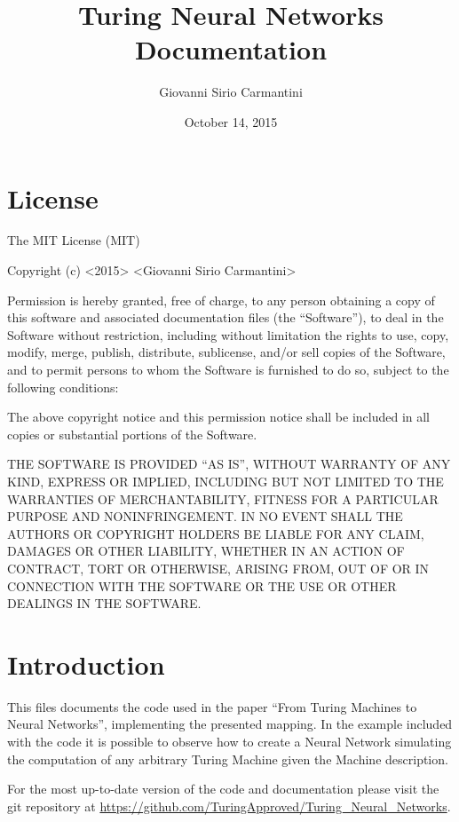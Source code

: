 \documentclass[letterpaper,10pt,english]{sphinxmanual}
\title{Turing Neural Networks Documentation}
\date{October 14, 2015}
\author{Giovanni Sirio Carmantini}
\begin{document}
\maketitle
\tableofcontents
{}\label{index::doc}



\chapter{License}
\label{license:turing-neural-networks-code-documentation}\label{license::doc}\label{license:license}
The MIT License (MIT)

Copyright (c) \textless{}2015\textgreater{} \textless{}Giovanni Sirio Carmantini\textgreater{}

Permission is hereby granted, free of charge, to any person obtaining a copy
of this software and associated documentation files (the ``Software''), to deal
in the Software without restriction, including without limitation the rights
to use, copy, modify, merge, publish, distribute, sublicense, and/or sell
copies of the Software, and to permit persons to whom the Software is
furnished to do so, subject to the following conditions:

The above copyright notice and this permission notice shall be included in
all copies or substantial portions of the Software.

THE SOFTWARE IS PROVIDED ``AS IS'', WITHOUT WARRANTY OF ANY KIND, EXPRESS OR
IMPLIED, INCLUDING BUT NOT LIMITED TO THE WARRANTIES OF MERCHANTABILITY,
FITNESS FOR A PARTICULAR PURPOSE AND NONINFRINGEMENT. IN NO EVENT SHALL THE
AUTHORS OR COPYRIGHT HOLDERS BE LIABLE FOR ANY CLAIM, DAMAGES OR OTHER
LIABILITY, WHETHER IN AN ACTION OF CONTRACT, TORT OR OTHERWISE, ARISING FROM,
OUT OF OR IN CONNECTION WITH THE SOFTWARE OR THE USE OR OTHER DEALINGS IN
THE SOFTWARE.


\chapter{Introduction}
\label{introduction_docs:introduction}\label{introduction_docs::doc}
This files documents the code used in the paper ``From Turing Machines
to Neural Networks'', implementing the presented mapping. In the
example included with the code it is possible to observe how to create
a Neural Network simulating the computation of any arbitrary Turing
Machine given the Machine description.

For the most up-to-date version of the code and documentation please
visit the git repository at
\href{https://github.com/TuringApproved/Turing\_Neural\_Networks}{https://github.com/TuringApproved/Turing\_Neural\_Networks}.
\end{document}
